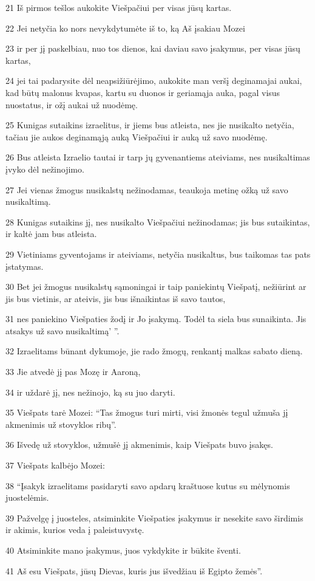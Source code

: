 \par 21 Iš pirmos tešlos aukokite Viešpačiui per visas jūsų kartas. 
\par 22 Jei netyčia ko nors nevykdytumėte iš to, ką Aš įsakiau Mozei 
\par 23 ir per jį paskelbiau, nuo tos dienos, kai daviau savo įsakymus, per visas jūsų kartas, 
\par 24 jei tai padarysite dėl neapsižiūrėjimo, aukokite man veršį deginamajai aukai, kad būtų malonus kvapas, kartu su duonos ir geriamąja auka, pagal visus nuostatus, ir ožį aukai už nuodėmę. 
\par 25 Kunigas sutaikins izraelitus, ir jiems bus atleista, nes jie nusikalto netyčia, tačiau jie aukos deginamąją auką Viešpačiui ir auką už savo nuodėmę. 
\par 26 Bus atleista Izraelio tautai ir tarp jų gyvenantiems ateiviams, nes nusikaltimas įvyko dėl nežinojimo. 
\par 27 Jei vienas žmogus nusikalstų nežinodamas, teaukoja metinę ožką už savo nusikaltimą. 
\par 28 Kunigas sutaikins jį, nes nusikalto Viešpačiui nežinodamas; jis bus sutaikintas, ir kaltė jam bus atleista. 
\par 29 Vietiniams gyventojams ir ateiviams, netyčia nusikaltus, bus taikomas tas pats įstatymas. 
\par 30 Bet jei žmogus nusikalstų sąmoningai ir taip paniekintų Viešpatį, nežiūrint ar jis bus vietinis, ar ateivis, jis bus išnaikintas iš savo tautos, 
\par 31 nes paniekino Viešpaties žodį ir Jo įsakymą. Todėl ta siela bus sunaikinta. Jis atsakys už savo nusikaltimą’ ”. 
\par 32 Izraelitams būnant dykumoje, jie rado žmogų, renkantį malkas sabato dieną. 
\par 33 Jie atvedė jį pas Mozę ir Aaroną, 
\par 34 ir uždarė jį, nes nežinojo, ką su juo daryti. 
\par 35 Viešpats tarė Mozei: “Tas žmogus turi mirti, visi žmonės tegul užmuša jį akmenimis už stovyklos ribų”. 
\par 36 Išvedę už stovyklos, užmušė jį akmenimis, kaip Viešpats buvo įsakęs. 
\par 37 Viešpats kalbėjo Mozei: 
\par 38 “Įsakyk izraelitams pasidaryti savo apdarų kraštuose kutus su mėlynomis juostelėmis. 
\par 39 Pažvelgę į juosteles, atsiminkite Viešpaties įsakymus ir nesekite savo širdimis ir akimis, kurios veda į paleistuvystę. 
\par 40 Atsiminkite mano įsakymus, juos vykdykite ir būkite šventi. 
\par 41 Aš esu Viešpats, jūsų Dievas, kuris jus išvedžiau iš Egipto žemės”.



